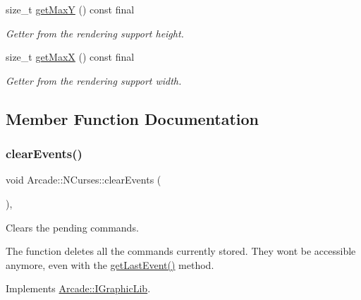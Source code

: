 \begin{DoxyCompactItemize}
size\+\_\+t \hyperlink{class_arcade_1_1_n_curses_a00c879117a1de6752acd376bfd59e94d}{get\+MaxY} () const final
\begin{DoxyCompactList}\small\item\em Getter from the rendering support height. \end{DoxyCompactList}\item 
size\+\_\+t \hyperlink{class_arcade_1_1_n_curses_a9f561bd405af76689763819794382ef1}{get\+MaxX} () const final
\begin{DoxyCompactList}\small\item\em Getter from the rendering support width. \end{DoxyCompactList}\end{DoxyCompactItemize}


\subsection{Member Function Documentation}
\mbox{\label{class_arcade_1_1_n_curses_a01dd738afe5e5546e165b911091b32cc}} 
\subsubsection{\texorpdfstring{clear\+Events()}{clearEvents()}}
{\footnotesize\ttfamily void Arcade\+::\+N\+Curses\+::clear\+Events (\begin{DoxyParamCaption}{ }\end{DoxyParamCaption})\hspace{0.3cm}{\ttfamily [final]}, {\ttfamily [virtual]}}



Clears the pending commands. 

The function deletes all the commands currently stored. They wont be accessible anymore, even with the \hyperlink{class_arcade_1_1_n_curses_a0c00b4aede0c9345f525fcb812fe8f78}{get\+Last\+Event()} method. 

Implements \hyperlink{class_arcade_1_1_i_graphic_lib_a78691f8f9433b2af945576231534c1e3}{Arcade\+::\+I\+Graphic\+Lib}.

\mbox{\label{class_arcade_1_1_n_curses_a1bbac59bdaa841d17439d01a06d9f5c3}} 
